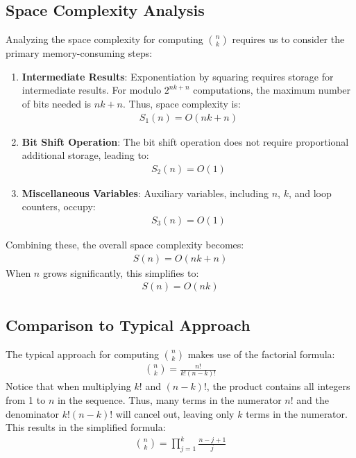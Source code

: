 \documentclass{article}
\theoremstyle{plain}
\theoremstyle{definition}
\begin{document}
\subsection{Space Complexity Analysis}
Analyzing the space complexity for computing $\binom{n}{k}$ requires us to consider the primary memory-consuming steps:
\begin{enumerate}
    \item \textbf{Intermediate Results}: Exponentiation by squaring requires storage for intermediate results. For modulo $2^{nk + n}$ computations, the maximum number of bits needed is $nk + n$. Thus, space complexity is:
    \begin{align}
        S_1(n) = O(nk + n)
    \end{align}
    \item \textbf{Bit Shift Operation}: The bit shift operation does not require proportional additional storage, leading to:
    \begin{align}
        S_2(n) = O(1)
    \end{align}
    \item \textbf{Miscellaneous Variables}: Auxiliary variables, including $n$, $k$, and loop counters, occupy:
    \begin{align}
        S_3(n) = O(1)
    \end{align}
\end{enumerate}
Combining these, the overall space complexity becomes:
\begin{align}
    S(n) = O(nk + n)
\end{align}
When \(n\) grows significantly, this simplifies to:
\begin{align}
    S(n) = O(nk)
\end{align}

\subsection{Comparison to Typical Approach}
The typical approach for computing $\binom{n}{k}$ makes use of the factorial formula:
\begin{align}
    \binom{n}{k} = \frac{n!}{k!(n-k)!}
\end{align}
Notice that when multiplying $k!$ and $(n-k)!$, the product contains all integers from 1 to $n$ in the sequence. Thus, many terms in the numerator $n!$ and the denominator $k!(n-k)!$ will cancel out, leaving only $k$ terms in the numerator. This results in the simplified formula:
\begin{align}
    \binom{n}{k} = \prod_{j=1}^{k} \frac{n-j+1}{j} 
\end{align}
\end{document}
